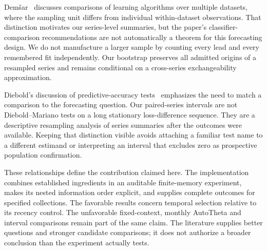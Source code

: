 Dem\v{s}ar~\cite{demsar} discusses comparisons of learning algorithms over multiple datasets, where the sampling unit differs from individual within-dataset observations. That distinction motivates our series-level summaries, but the paper's classifier-comparison recommendations are not automatically a theorem for this forecasting design. We do not manufacture a larger sample by counting every lead and every remembered fit independently. Our bootstrap preserves all admitted origins of a resampled series and remains conditional on a cross-series exchangeability approximation.

Diebold's discussion of predictive-accuracy tests~\cite{dmreview} emphasizes the need to match a comparison to the forecasting question. Our paired-series intervals are not Diebold--Mariano tests on a long stationary loss-difference sequence. They are a descriptive resampling analysis of series summaries after the outcomes were available. Keeping that distinction visible avoids attaching a familiar test name to a different estimand or interpreting an interval that excludes zero as prospective population confirmation.

These relationships define the contribution claimed here. The implementation combines established ingredients in an auditable finite-memory experiment, makes its nested information order explicit, and supplies complete outcomes for specified collections. The favorable results concern temporal selection relative to its recency control. The unfavorable fixed-context, monthly AutoTheta and interval comparisons remain part of the same claim. The literature supplies better questions and stronger candidate comparisons; it does not authorize a broader conclusion than the experiment actually tests.
